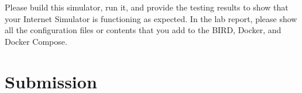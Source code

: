 Please build this simulator, run it, and provide  
the testing results to show that your Internet Simulator is functioning 
as expected. 
In the lab report, please show all the configuration files or contents
that you add to the BIRD, Docker, and Docker Compose. 



\section{Submission}









